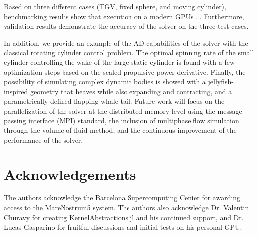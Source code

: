 \documentclass[10pt,a4paper]{article}
\begin{document}
Based on three different cases (TGV, fixed sphere, and moving cylinder), benchmarking results show that execution on a modern GPUs . . Furthermore, validation results demonstrate the accuracy of the solver on the three test cases. 

In addition, we provide an example of the AD capabilities of the solver with the classical rotating cylinder control problem. The optimal spinning rate of the small cylinder controlling the wake of the large static cylinder is found with a few optimization steps based on the scaled propulsive power derivative. Finally, the possibility of simulating complex dynamic bodies is showed with a jellyfish-inspired geometry that heaves while also expanding and contracting, and a parametrically-defined flapping whale tail. Future work will focus on the parallelization of the solver at the distributed-memory level using the message passing interface (MPI) standard, the inclusion of multiphase flow simulation through the volume-of-fluid method, and the continuous improvement of the performance of the solver.

\section{Acknowledgements}\label{sec:acknowledgements}
The authors acknowledge the Barcelona Supercomputing Center for awarding access to the MareNostrum5 system. The authors also acknowledge Dr. Valentin Churavy for creating KernelAbstractions.jl and his continued support, and Dr. Lucas Gasparino for fruitful discussions and initial tests on his personal GPU.



\end{document}
